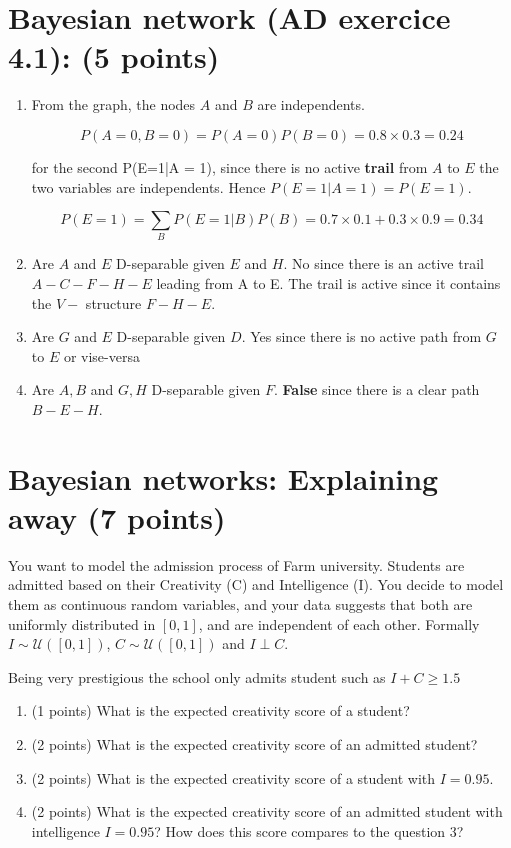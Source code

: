 \documentclass[10pt]{article}
\begin{document}
\section{Bayesian network (AD exercice 4.1): (5 points)}

\begin{enumerate}[label=(\alph*)]
\item From the graph, the nodes $A$ and $B$ are independents.

  $$
  P(A=0, B = 0) = P(A=0)P(B=0) = 0.8 \times 0.3 = 0.24
  $$

  for the second P(E=1|A = 1), since there is no active \textbf{trail} from $A$
  to $E$ the two variables are independents. Hence $P(E=1|A=1) = P(E=1)$.


  $$
  P(E=1) = \sum_B P(E=1|B)P(B) = 0.7\times0.1 + 0.3\times0.9 = 0.34
  $$

 \item Are $A$ and $E$ D-separable given $E$ and $H$. No since there is an
   active trail $A-C-F-H-E$ leading from A to E. The trail is active since it
   contains the $V-$ structure $F-H-E$.
  \item Are $G$ and $E$ D-separable given $D$. Yes since there is no active path
    from $G$ to $E$ or vise-versa
    \item  Are ${A,B}$ and ${G,H}$ D-separable given $F$. \textbf{False} since
      there is a clear path $B-E-H$.
\end{enumerate}
\section{Bayesian networks: Explaining away (7 points)}

You want to model the admission process of Farm university. Students are
admitted based on their Creativity (C) and Intelligence (I). You decide  to
model them as continuous random variables, and your data suggests that both are
uniformly distributed in $[0,1]$, and are independent of each other. Formally
$I\sim\mathcal{U}([0,1])$, $C\sim\mathcal{U}([0,1])$ and $I \perp C$.

Being very prestigious the school only admits student such as $I + C \geq 1.5$

\begin{enumerate}
\item (1 points) What is the expected creativity score of a student?
  \item (2 points) What is the expected creativity score of an admitted student?
    \item (2 points) What is the expected creativity  score of a student with $I=0.95$.
    \item (2 points) What is the expected creativity score of an admitted
      student with intelligence $I=0.95$? How does this score compares to the
      question 3?
\end{enumerate}
\end{document}
